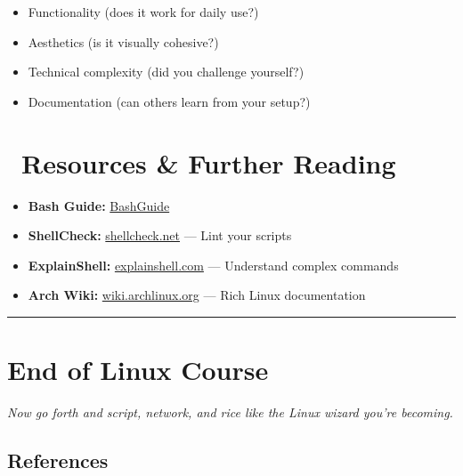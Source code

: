 \documentclass[12pt]{article}
\newcommand{\penguinicon}{\faLinux}
\newcommand{\bookicon}{\faBook}
\begin{document}
\begin{itemize}
    \item Functionality (does it work for daily use?)
    \item Aesthetics (is it visually cohesive?)
    \item Technical complexity (did you challenge yourself?)
    \item Documentation (can others learn from your setup?)
\end{itemize}

\section*{\bookicon\ Resources \& Further Reading}

\begin{itemize}
    \item \textbf{Bash Guide:} \href{https://mywiki.wooledge.org/BashGuide}{BashGuide}
    \item \textbf{ShellCheck:} \href{https://www.shellcheck.net/}{shellcheck.net} — Lint your scripts
    \item \textbf{ExplainShell:} \href{https://explainshell.com/}{explainshell.com} — Understand complex commands
    \item \textbf{Arch Wiki:} \href{https://wiki.archlinux.org/}{wiki.archlinux.org} — Rich Linux documentation
\end{itemize}

\vspace{1em}
\begin{center}
\color{teamred}\rule{0.8\textwidth}{1pt}
\end{center}

\section*{End of Linux Course}

\begin{center}
\large\textit{Now go forth and script, network, and rice like the Linux wizard you're becoming.} \penguinicon
\end{center}

\vspace{1em}

\subsection*{References}
\end{document}
